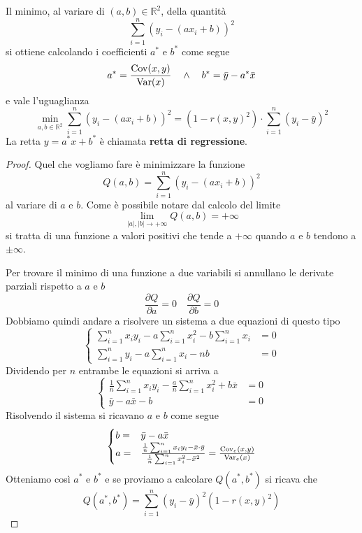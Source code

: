 \begin{theorem}
	Il minimo, al variare di $(a, b) \in \mathbb{R}^2$, della quantità
	\[ \sum_{i=1}^n (y_i - (a x_i + b))^2 \]
	si ottiene calcolando i coefficienti $a^*$ e $b^*$ come segue
	\[ a^* = \frac{\operatorname{Cov}(x, y)}{\operatorname{Var}(x)} \quad \wedge \quad b^* = \bar{y} - a^* \bar{x} \]
	e vale l'uguaglianza
	\[
		\min_{a, b \in \mathbb{R}^2} \sum_{i=1}^n (y_i - (a x_i + b))^2 =
		(1 - r(x, y)^2) \cdot \sum_{i=1}^n (y_i - \bar{y})^2
	\]
	La retta $y = a^* x + b^*$ è chiamata \textbf{retta di regressione}.
	\begin{proof}
		Quel che vogliamo fare è minimizzare la funzione
		\[ Q(a, b) = \sum_{i=1}^n (y_i - (a x_i + b))^2 \]
		al variare di $a$ e $b$. Come è possibile notare dal calcolo del limite
		\[ \lim_{|a|, |b| \to +\infty} Q(a, b) = +\infty \]
		si tratta di una funzione a valori positivi che tende a $+\infty$ quando $a$ e $b$
		tendono a
		$\pm\infty$.

		Per trovare il minimo di una funzione a due variabili si annullano le derivate parziali
		rispetto a $a$ e $b$
		\[ \frac{\partial Q}{\partial a} = 0 \quad \frac{\partial Q}{\partial b} = 0 \]
		Dobbiamo quindi andare a risolvere un sistema a due equazioni di questo tipo
		\[
			\begin{cases}
				\sum_{i=1}^n x_i y_i - a \sum_{i=1}^n x_i^2 - b \sum_{i=1}^n x_i & = 0 \\
				\sum_{i=1}^n y_i - a \sum_{i=1}^n x_i - n b                      & = 0
			\end{cases}
		\]
		Dividendo per $n$ entrambe le equazioni si arriva a
		\[
			\begin{cases}
				\frac{1}{n} \sum_{i=1}^n x_i y_i - \frac{a}{n} \sum_{i=1}^n x_i^2 +
				b \bar{x}               & = 0 \\
				\bar{y} - a \bar{x} - b & = 0
			\end{cases}
		\]
		Risolvendo il sistema si ricavano $a$ e $b$ come segue
		\[
			\begin{cases}
				b = & \bar{y} - a \bar{x}                      \\
				a = & \frac{\frac{1}{n} \sum_{i=1}^n x_i y_i -
					\bar{x} \cdot \bar{y}}
				{\frac{1}{n} \sum_{i=1}^n x_i^2 - \bar{x}^2} =
				\frac{\operatorname{Cov}_e(x, y)}{\operatorname{Var}_e(x)}
			\end{cases}
		\]
		Otteniamo così $a^*$ e $b^*$ e se proviamo a calcolare $Q(a^*, b^*)$ si ricava che
		\[ Q(a^*, b^*) = \sum_{i=1}^n (y_i - \bar{y})^2 (1 - r(x, y)^2) \]
	\end{proof}
\end{theorem}

